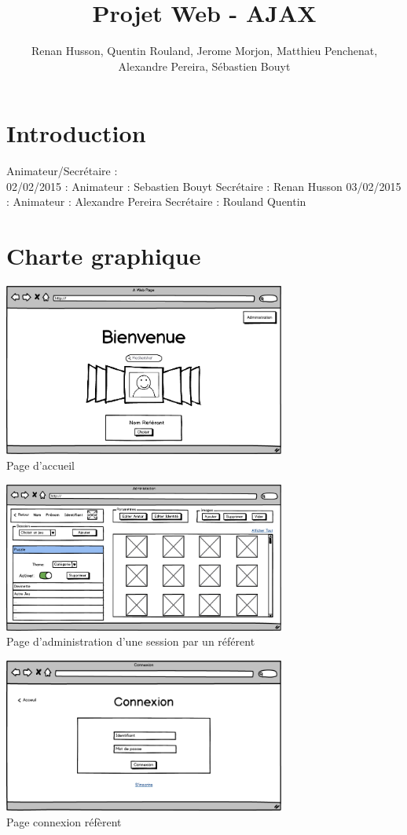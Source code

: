 \documentclass[12pt,a4paper]{report}
\author{Renan Husson, Quentin Rouland, Jerome Morjon, Matthieu Penchenat, Alexandre Pereira, Sébastien Bouyt}
\affil{Université Toulouse, Jean Jaurès - L3 MIASHS \\ Document D2 : Conceptio}
\begin{document}
\title{Projet Web - AJAX}
\maketitle
\renewcommand{\contentsname}{Sommaire}
\tableofcontents
\chapter*{Introduction}
Animateur/Secrétaire : \\
02/02/2015 : Animateur : Sebastien Bouyt Secrétaire : Renan Husson 
03/02/2015 : Animateur : Alexandre Pereira Secrétaire : Rouland Quentin


\chapter{Charte graphique}
\includegraphics[width=350px]{../Maquette/Acceuil.png}\\
Page d’accueil

\includegraphics[width=350px]{../Maquette/Admin.png}\\
Page d’administration d’une session par un référent

\includegraphics[width=350px]{../Maquette/Connexion.png}\\
Page connexion réfèrent
\end{document}

